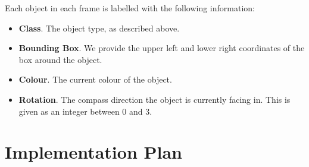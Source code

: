 \documentclass[../interim.tex]{subfiles}
\begin{document}
Each object in each frame is labelled with the following information:
\begin{itemize}
  \item \textbf{Class}. The object type, as described above.

  \item \textbf{Bounding Box}. We provide the upper left and lower right coordinates of the box around the object.

  \item \textbf{Colour}. The current colour of the object.

  \item \textbf{Rotation}. The compass direction the object is currently facing in. This is given as an integer between 0 and 3.
\end{itemize}

\section{Implementation Plan}
\end{document}
